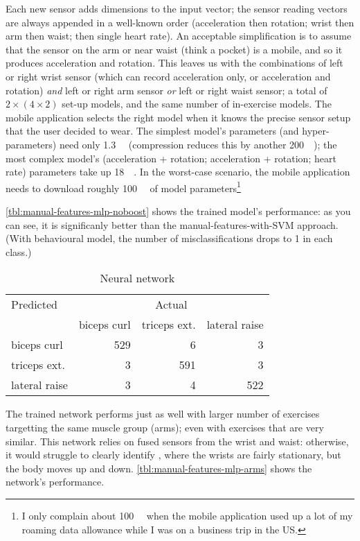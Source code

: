 Each new sensor adds dimensions to the input vector; the sensor reading vectors are always appended in a well-known order (acceleration then rotation; wrist then arm then waist; then single heart rate). An acceptable simplification is to assume that the sensor on the arm or near waist (think a pocket) is a mobile, and so it produces acceleration and rotation. This leaves us with the combinations of left or right wrist sensor (which can record acceleration only, or acceleration and rotation) \emph{and} left or right arm sensor \emph{or} left or right waist sensor; a total of $2\times(4\times2)$ set-up models, and the same number of in-exercise models. The mobile application selects the right model when it knows the precise sensor setup that the user decided to wear. The simplest model's parameters (and hyper-parameters) need only \SI{1.3}{\mebi\byte} (compression reduces this by another \SI{200}{\kibi\byte}); the most complex model's (acceleration + rotation; acceleration + rotation; heart rate) parameters take up \SI{18}{\mebi\byte}. In the worst-case scenario, the mobile application needs to download roughly \SI{100}{\mebi\byte} of model parameters\footnote{I only complain about \SI{100}{\mebi\byte} when the mobile application used up a lot of my roaming data allowance while I was on a business trip in the US.}

\autoref{tbl:manual-features-mlp-noboost} shows the trained model's performance: as you can see, it is significanly better than the manual-features-with-SVM approach. (With behavioural model, the number of misclassifications drops to 1 in each class.)

\begin{table}[h]
    \begin{tabular}{lrrr}
        \toprule
        Predicted         & \multicolumn{3}{c}{Actual} \\
        \cmidrule(r){2-4} & biceps curl & triceps ext. & lateral raise \\
        \midrule
        biceps curl       & 529         & 6            & 3 \\ 
        triceps ext.      & 3           & 591          & 3 \\
        lateral raise     & 3           & 4            & 522 \\
        \bottomrule
    \end{tabular}
    \caption{Neural network}
    \label{tbl:manual-features-mlp-noboost}
\end{table}

The trained network performs just as well with larger number of exercises targetting the same muscle group (arms); even with exercises that are very similar. This network relies on fused sensors from the wrist and waist: otherwise, it would struggle to clearly identify , where the wrists are fairly stationary, but the body moves up and down. \autoref{tbl:manual-features-mlp-arms} shows the network's performance.

